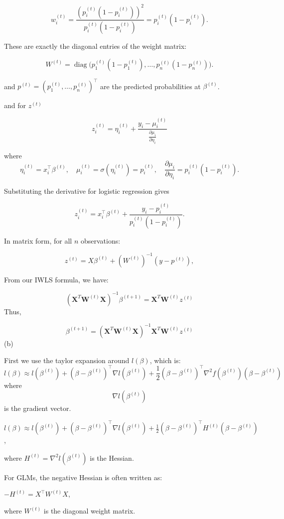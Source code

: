 \documentclass[12pt,halfline,a4paper,]{ouparticle}
\begin{document}
\[
w_i^{(t)} = \frac{\left(p_i^{(t)} (1 - p_i^{(t)})\right)^2}{p_i^{(t)} (1 - p_i^{(t)})} 
= p_i^{(t)} (1 - p_i^{(t)}).
\]

These are exactly the diagonal entries of the weight matrix:

\[
W^{(t)} = \operatorname{diag}\Big(p_1^{(t)} (1 - p_1^{(t)}), \dots, p_n^{(t)} (1 - p_n^{(t)})\Big).
\]

and \(p^{(t)} = (p_1^{(t)}, \dots, p_n^{(t)})^\top\) are the predicted
probabilities at \(\beta^{(t)}\).

and for \(z^{(t)}\)

\[z_i^{(t)} = \eta_i^{(t)} + \frac{y_i - \mu_i^{(t)}}{\frac{\partial \mu_i}{\partial \eta_i}}\]

where \[
\eta_i^{(t)} = x_i^\top \beta^{(t)}, \quad \mu_i^{(t)} = \sigma(\eta_i^{(t)}) = p_i^{(t)}, \quad \frac{\partial \mu_i}{\partial \eta_i} = p_i^{(t)} (1 - p_i^{(t)}).
\]

Substituting the derivative for logistic regression gives

\[
z_i^{(t)} = x_i^\top \beta^{(t)} + \frac{y_i - p_i^{(t)}}{p_i^{(t)} (1 - p_i^{(t)})}.
\]

In matrix form, for all \(n\) observations:

\[
z^{(t)} = X \beta^{(t)} + (W^{(t)})^{-1} (y - p^{(t)}),
\]

From our IWLS formula, we have:

\[ (\textbf{X}^T \textbf{W}^{(t)} \textbf{X})^{-1} \beta^{(t+1)} = \textbf{X}^T \textbf{W}^{(t)} z^{(t)} \]
Thus,

\[  \beta^{(t+1)} = (\textbf{X}^T \textbf{W}^{(t)} \textbf{X})^{-1}\textbf{X}^T \textbf{W}^{(t)} z^{(t)} \]
(b)

First we use the taylor expansion around \(l(\beta)\), which is: \[
l(\beta) \approx l(\beta^{(t)}) 
+ (\beta - \beta^{(t)})^\top \nabla l(\beta^{(t)}) 
+ \frac{1}{2} (\beta - \beta^{(t)})^\top \nabla^2 f(\beta^{(t)}) (\beta - \beta^{(t)})
\] where \[\nabla l(\beta^{(t)}) \] is the gradient vector.

\(l(\beta) \approx l(\beta^{(t)}) + (\beta - \beta^{(t)})^\top \nabla l(\beta^{(t)}) + \frac{1}{2} (\beta - \beta^{(t)})^\top H^{(t)} (\beta - \beta^{(t)})\),

where \(H^{(t)} = \nabla^2 l(\beta^{(t)})\) is the Hessian.

For GLMs, the negative Hessian is often written as:

\(-H^{(t)} = X^\top W^{(t)} X\),

where \(W^{(t)}\) is the diagonal weight matrix.
\end{document}
